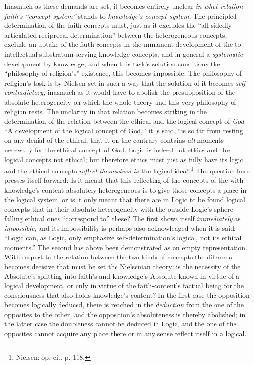 \documentclass[12pt,a4paper]{book}
\begin{document}
Inasmuch as these demands are set, it becomes entirely unclear \emph{in what relation faith's ``concept-system''} stands to
\emph{knowledge's concept-system}. The principled determination of the faith-concepts must, just as it excludes the
``all-sidedly articulated reciprocal determination'' between the heterogeneous concepts, exclude an uptake of the
faith-concepts in the immanent development of the to intellectual substratum serving knowledge-concepts, and in general
a \emph{systematic} development by knowledge, and when this task's solution conditions the ``philosophy of religion's''
existence, this becomes impossible. The philosophy of religion's task is by Nielsen set in such a way that the solution
of it becomes \emph{self-contradictory}, inasmuch as it would have to abolish the presupposition of the absolute
heterogeneity on which the whole theory and this very philosophy of religion rests. The unclarity in that relation
becomes striking in the determination of the relation between the ethical and the logical concept of \emph{God}. ``A
development of the logical concept of God,'' it is said, ``is so far from resting on any denial of the ethical, that it
on the contrary contains \emph{all} moments necessary for the ethical concept of God. Logic is indeed not ethics and the
logical concepts not ethical; but therefore ethics must just as fully have its logic and the ethical concepts \emph{reflect
themselves in} the logical idea''.\footnote{Nielsen: op. cit. p. 118.} The question here presses itself forward: Is it
meant that this reflecting of the concepts of the with knowledge's content absolutely heterogeneous is to give those
concepts a place in the logical system, or is it only meant that there are in Logic to be found logical concepts that
in their absolute heterogeneity with the outside Logic's sphere falling ethical ones ``correspond to'' these? The first
shows itself \emph{immediately} as \emph{impossible}, and its impossibility is perhaps also acknowledged when it is said: ``Logic can,
as Logic, only emphasize self-determination's logical, not its ethical moments.'' The second has above been demonstrated
as an empty representation. With respect to the relation between the two kinds of concepts the dilemma becomes decisive
that must be set the Nielsenian theory: is the necessity of the Absolute's splitting into faith's and knowledge's
Absolute known in virtue of a logical development, or only in virtue of the faith-content's factual being for the
consciousness that also holds knowledge's content? In the first case the opposition becomes logically deduced, there is
reached in the \emph{deduction} from the one of the opposites to the other, and the opposition's absoluteness is thereby
abolished; in the latter case the doubleness cannot be deduced in Logic, and the one of the opposites cannot acquire any
place there or in any sense reflect itself in a logical.
\end{document}
